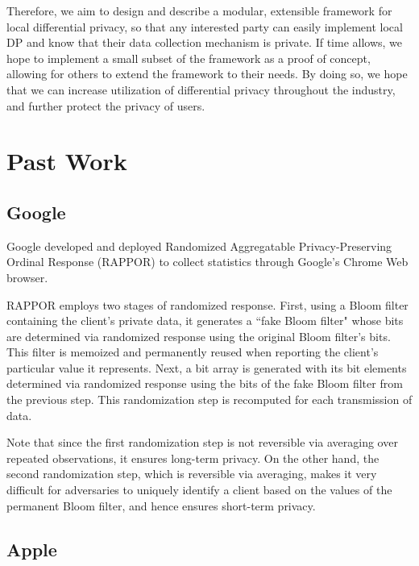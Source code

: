 \documentclass[12pt]{article}
\begin{document}
\medskip

Therefore, we aim to design and describe a modular, extensible framework for local differential privacy, so that any interested party can easily implement local DP and know that their data collection mechanism is private. If time allows, we hope to implement a small subset of the framework as a proof of concept, allowing for others to extend the framework to their needs. By doing so, we hope that we can increase utilization of differential privacy throughout the industry, and further protect the privacy of users.

\section*{Past Work}

\subsection*{Google}

\noindent

Google developed and deployed Randomized Aggregatable Privacy-Preserving Ordinal Response (RAPPOR) to collect statistics through Google's Chrome Web browser.

\medskip

RAPPOR employs two stages of randomized response. First, using a Bloom filter containing the client's private data, it generates a ``fake Bloom filter" whose bits are determined via randomized response using the original Bloom filter's bits. This filter is memoized and permanently reused when reporting the client's particular value it represents. Next, a bit array is generated with its bit elements determined via randomized response using the bits of the fake Bloom filter from the previous step. This randomization step is recomputed for each transmission of data.

\medskip

Note that since the first randomization step is not reversible via averaging over repeated observations, it ensures long-term privacy. On the other hand, the second randomization step, which is reversible via averaging, makes it very difficult for adversaries to uniquely identify a client based on the values of the permanent Bloom filter, and hence ensures short-term privacy.

\subsection*{Apple}
\end{document}
